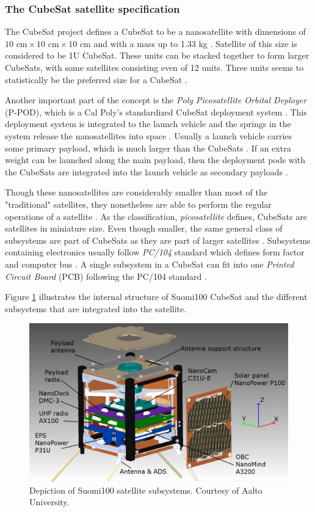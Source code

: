 \documentclass[english,12pt,a4paper,pdftex,elec,utf8]{aaltothesis}
\begin{document}
\subsubsection{The CubeSat satellite specification}
The CubeSat project defines a CubeSat to be a nanosatellite with dimensions of ${10 \textrm{ cm} \times10 \textrm{ cm} \times{10} \textrm{ cm}}$ and with a mass up to 1.33 kg \cite{cds}. Satellite of this size is considered to be 1U CubeSat. These units can be stacked together to form larger CubeSats, with some satellites consisting even of 12 units. Three units seems to statistically be the preferred size for a CubeSat \cite{Swart2016}. \par
Another important part of the concept is the \textit{Poly Picosatellite Orbital Deployer} (P-POD), which is a Cal Poly’s standardized CubeSat deployment system \cite{cds}. This deployment system is integrated to the launch vehicle and the springs in the system release the nanosatellites into space \cite{cds}. Usually a launch vehicle carries some primary payload, which is much larger than the CubeSats \cite{nasacubesat1}. If an extra weight can be launched along the main payload, then the deployment pods with the CubeSats are integrated into the launch vehicle as secondary payloads \cite{nasacubesat1}. \par 
Though these nanosatellites are considerably smaller than most of the "traditional" satellites, they nonetheless are able to perform the regular operations of a satellite \cite{openorbiter}. As the classification, \textit{picosatellite} defines, CubeSats are satellites in miniature size. Even though smaller, the same general class of subsystems are part of CubeSats as they are part of larger satellites \cite{openorbiter}. Subsystems containing electronics usually follow \textit{PC/104} standard which defines form factor and computer bus \cite{reliabilitycubesatelbus}. A single subsystem in a CubeSat can fit into one \textit{Printed Circuit Board} (PCB) following the PC/104 standard \cite{reliabilitycubesatelbus}.\par
Figure \ref{s100cad} illustrates the internal structure of Suomi100 CubeSat and the different subsystems that are integrated into the satellite.\par 
\begin{figure}[!h]
\centering
\includegraphics[scale=0.2]{s100cad}
\caption{Depiction of Suomi100 satellite subsystems. Courtesy of Aalto University.}
\label{s100cad}
\end{figure}  
\end{document}
